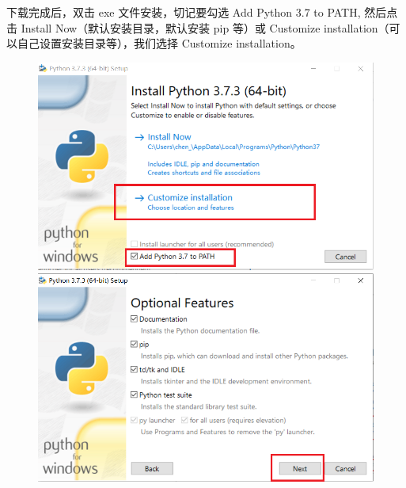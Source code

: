 下载完成后，双击 exe 文件安装，切记要勾选 Add Python 3.7 to PATH, 然后点击 Install Now（默认安装目录，默认安装 pip 等）或 Customize installation（可以自己设置安装目录等），我们选择 Customize installation。

\begin{figure}[ht]
  \centering
  \includegraphics[scale=0.4]{figure/chapter1/PythonDownload2.png}\quad
  \includegraphics[scale=0.4]{figure/chapter1/PythonDownload4.png}
\end{figure}

